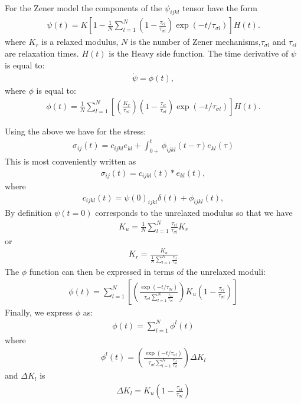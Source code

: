 \documentclass[11pt]{article}
\begin{document}
{\begin{eqnarray}
\end{eqnarray}
For the Zener model the components of the $\psi_{ijkl}$ tensor have the form
\begin{eqnarray}
  \psi(t)=K\left[1-\frac{1}{N}\sum_{l=1}^N 
            (1-\frac{\tau_{\epsilon l}}{\tau_{\sigma l}})\exp(-t/\tau_{\sigma l})\right]H(t).
\end{eqnarray}
%
where $K_r$ is a relaxed modulus, $N$ is the number of Zener mechanisms,$\tau_{\sigma l}$
and $\tau_{\epsilon l}$ are relaxation times. $H(t)$ is the Heavy side function.
The time derivative of $\psi$ is equal to:
\begin{eqnarray}
\dot{\psi} = \phi(t),
\end{eqnarray}
where $\phi$ is equal to:
\begin{eqnarray}
\phi(t)=
  \frac{1}{N}\sum_{l=1}^N\left[\left(\frac{K_r}{\tau_{\sigma l}}\right) 
            \left(1-\frac{\tau_{\epsilon l}}{\tau_{\sigma l}}\right)\exp(-t/\tau_{\sigma l})\right]H(t).
                \label{eq:phi}
\end{eqnarray}

Using the above we have for the stress:
\begin{eqnarray}
\sigma_{ij}(t)=c_{ijkl}e_{kl} +\int_{0+}^t \phi_{ijkl}(t-\tau)e_{kl}(\tau)
\end{eqnarray}
This is most conveniently written as
\begin{eqnarray}
\sigma_{ij}(t)=c_{ijkl}(t)*e_{kl}(t),
\end{eqnarray}
where
\begin{eqnarray}
 c_{ijkl}(t)=\psi(0)_{ijkl}\delta(t) +\phi_{ijkl}(t),
\end{eqnarray}
%
By definition $\psi(t=0)$ corresponds to the unrelaxed modulus so that we have
\begin{eqnarray}
K_u = \frac{1}{N}\sum_{l=1}^N \frac{\tau_{\epsilon l}}{\tau_{\sigma l}} K_r
\end{eqnarray}
or
\begin{eqnarray}
K_r = \frac{K_u}{\frac{1}{N}\sum_{l=1}^N \frac{\tau_{\epsilon l}}{\tau_{\sigma l}}}
\end{eqnarray}
The $\phi$ function can then be expressed in terms of the unrelaxed moduli:
\begin{eqnarray}
\phi(t) =   
  \sum_{l=1}^N\left[\left(\frac{\exp(-t/\tau_{\sigma l})}{\tau_{\sigma l}\sum_{l=1}^N \frac{\tau_{\epsilon l}}{\tau_{\sigma l}}}\right)
            K_u\left(1-\frac{\tau_{\epsilon l}}{\tau_{\sigma l}}\right)\right]
\end{eqnarray}
Finally, we express $\phi$ as:
\begin{eqnarray}
\phi(t) = \sum_{l=1}^N \phi^l(t)
\end{eqnarray}
where
\begin{eqnarray}
\phi^l(t) = 
  \left(\frac{\exp(-t/\tau_{\sigma l})}{\tau_{\sigma l}\sum_{l=1}^N \frac{\tau_{\epsilon l}}{\tau_{\sigma l}}}\right)
            \Delta K_l
\end{eqnarray}
and $\Delta K_l$ is
\begin{eqnarray}
\Delta K_l = K_u\left(1-\frac{\tau_{\epsilon l}}{\tau_{\sigma l}}\right)
\end{eqnarray}

}
\end{document}
